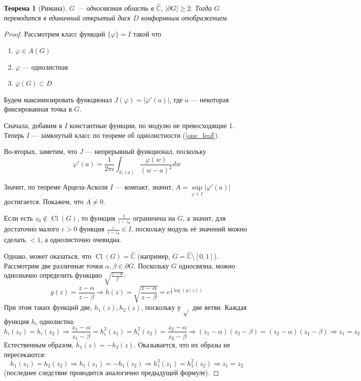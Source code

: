 \documentclass[12pt]{article}
\renewcommand{\C}{\mathbb{C}}
\newcommand{\Ra}{\Rightarrow}
\newcounter{cnt}
\theoremstyle{thmnote}
\newtheorem{theorem}[cnt]{Теорема}
\theoremstyle{remark}
\theoremstyle{defnote}
\begin{document}
\begin{theorem}[Римана]
\label{riemann}
    $G$ --- односвязная область в $\hat{\C}$, $|\partial G| \geq 2$. Тогда $G$ переводится в единичный открытый диск $D$ конформным отображением.
\end{theorem}
\begin{proof}
    Рассмотрим класс функций $\{\varphi\} = I$ такой что
    \begin{enumerate}
        \item $\varphi \in A(G)$
        \item $\varphi$ --- однолистная
        \item $\varphi(G) \subset D$
    \end{enumerate}

    Будем максимизировать функционал $J(\varphi) = |\varphi'(a)|$, где $a$ --- некоторая фиксированная точка в $G$.

    Сначала, добавим в $I$ константные функции, по модулю не превосходящие 1. Теперь $I$ --- замкнутый класс по теореме об однолистности (\ref{one_leaf}).

    Во-вторых, заметим, что $J$ --- непрерывный функционал, поскольку
    \begin{equation*}
        \varphi'(a) = \frac{1}{2 \pi i} \int_{S_\varepsilon(a)} \frac{\varphi(w)}{(w - a)^2} dw
    \end{equation*}

    Значит, по теореме Арцела-Асколи $I$ --- компакт, значит, $A = \underset{\varphi \in I}{\sup} |\varphi'(a)|$ достигается. Покажем, что $A \neq 0$.

    Если есть $z_0 \notin \operatorname*{Cl}(G)$, то функция $\frac{1}{z - z_0}$ ограничена на $G$, а значит, для достаточно малого $\varepsilon > 0$ функция $\frac{\varepsilon}{z - z_0} \in I$, поскольку модуль её значений можно сделать $< 1$, а однолисточно очевидна.
    
    Однако, может оказаться, что $\operatorname*{Cl}(G) = \hat{\C}$ (например, $G = \hat{\C} \setminus [0, 1]$). Рассмотрим две различные точки $\alpha, \beta \in \partial G$. Поскольку $G$ односвязна, можно однозначно определить функцию $\sqrt{\frac{z - \alpha}{\beta}}$:
    \begin{equation*}
        g(z) = \frac{z - \alpha}{z - \beta} \Ra h(z) = \sqrt{\frac{z - \alpha}{z - \beta}} = e^{\frac{1}{2} \log(g(z))}
    \end{equation*}
    При этом таких функций две, $h_1(z), h_2(z)$, поскольку у $\sqrt{}$ две ветви. Каждая функция $h_i$ однолистна:
    \begin{equation*}
        h_i(z_1) = h_i(z_2) \Ra \frac{z_1 - \alpha}{z_1 - \beta} = h_i^2(z_1) = h_i^2(z_2) = \frac{z_2 - \alpha}{z_2 - \beta} \Ra (z_1 - \alpha)(z_2 - \beta) = (z_2 - \alpha)(z_1 - \beta) \Ra z_1 = z_2
    \end{equation*}
    Естественным образом, $h_1(z) = -h_2(z)$. Оказывается, что их образы не пересекаются:
    \begin{equation*}
        h_1(z_1) = h_2(z_2) \Ra h_1(z_1) = -h_1(z_2) \Ra h_1^2(z_1) = h_1^2(z_2) \Ra z_1 = z_2
    \end{equation*}
    (последнее следствие проводится аналогично предыдущей формуле). 


\end{proof}
\end{document}
